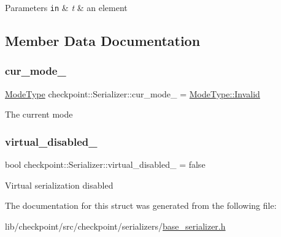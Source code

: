 \begin{DoxyParams}[1]{Parameters}
\mbox{\tt in}  & {\em t} & an element \\
\hline
\end{DoxyParams}


\subsection{Member Data Documentation}
\mbox{\label{structcheckpoint_1_1_serializer_a89a1f207ad5ff75654cb6d48f432be37}} 
\subsubsection{\texorpdfstring{cur\+\_\+mode\+\_\+}{cur\_mode\_}}
{\footnotesize\ttfamily \hyperlink{namespacecheckpoint_ae2509499ccd8b1dc48fb535bf8aa3059}{Mode\+Type} checkpoint\+::\+Serializer\+::cur\+\_\+mode\+\_\+ = \hyperlink{namespacecheckpoint_ae2509499ccd8b1dc48fb535bf8aa3059a4bbb8f967da6d1a610596d7257179c2b}{Mode\+Type\+::\+Invalid}\hspace{0.3cm}{\ttfamily [protected]}}

The current mode \mbox{\label{structcheckpoint_1_1_serializer_a46ef3c0da77d80853882a7cad641c2af}} 
\subsubsection{\texorpdfstring{virtual\+\_\+disabled\+\_\+}{virtual\_disabled\_}}
{\footnotesize\ttfamily bool checkpoint\+::\+Serializer\+::virtual\+\_\+disabled\+\_\+ = false\hspace{0.3cm}{\ttfamily [protected]}}

Virtual serialization disabled 

The documentation for this struct was generated from the following file\+:\begin{DoxyCompactItemize}
\item 
lib/checkpoint/src/checkpoint/serializers/\hyperlink{base__serializer_8h}{base\+\_\+serializer.\+h}\end{DoxyCompactItemize}
